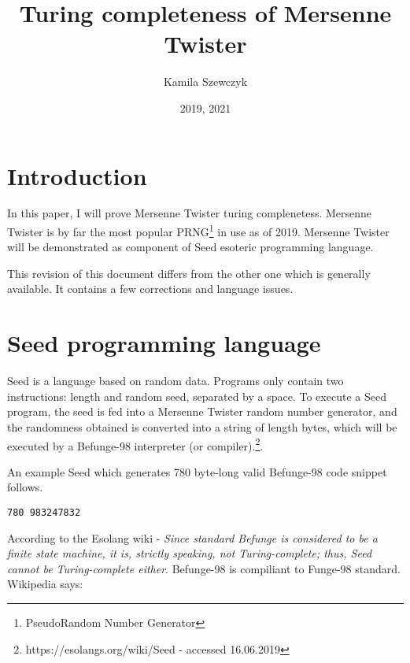 \documentclass{article}
\title{Turing completeness of Mersenne Twister}
\date{2019, 2021}
\author{Kamila Szewczyk}
\begin{document}
\maketitle

\section{Introduction}
\par In this paper, I will prove Mersenne Twister turing complenetess. Mersenne Twister is by far the most popular PRNG\footnote{PseudoRandom Number Generator} in use as of 2019. Mersenne Twister will be demonstrated as component of Seed esoteric programming language.

\par This revision of this document differs from the other one which is generally available. It contains a few corrections and language issues.

\section{Seed programming language}
\par Seed is a language based on random data. Programs only contain two instructions: length and random seed, separated by a space. To execute a Seed program, the seed is fed into a Mersenne Twister random number generator, and the randomness obtained is converted into a string of length bytes, which will be executed by a Befunge-98 interpreter (or compiler).\footnote{https://esolangs.org/wiki/Seed - accessed 16.06.2019}.

\par An example Seed which generates 780 byte-long valid Befunge-98 code snippet follows.

\begin{verbatim}
780 983247832
\end{verbatim}

\par According to the Esolang wiki - \textit{Since standard Befunge is considered to be a finite state machine, it is, strictly speaking, not Turing-complete; thus, Seed cannot be Turing-complete either}. Befunge-98 is compiliant to Funge-98 standard. Wikipedia says: 
\end{document}
